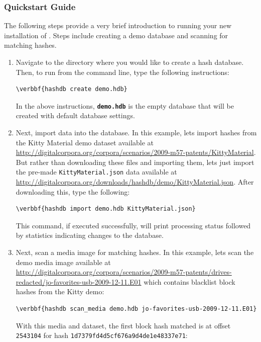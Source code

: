 \documentclass[11pt,fleqn]{article} %
\begin{document}
\subsubsection{Quickstart Guide}
The following steps provide a very brief introduction to running your new installation of \hdb. Steps include creating a demo database and scanning for matching hashes. 
\begin{enumerate}
\item Navigate to the directory where you would like to create a hash database. Then, to run \hdb from the command line, type the following instructions: 
\begin{Verbatim}[commandchars=\\\{\}]
\verbbf{hashdb create demo.hdb}
\end{Verbatim} 

In the above instructions, \texttt{\textbf{demo.hdb}} is the empty database that will be created with default database settings.

\item Next, import data into the database. In this example, lets import hashes from the Kitty Material demo dataset available at \url{http://digitalcorpora.org/corpora/scenarios/2009-m57-patents/KittyMaterial}. But rather than downloading these files and importing them, lets just import the pre-made \verb+KittyMaterial.json+ data available at \url{http://digitalcorpora.org/downloads/hashdb/demo/KittyMaterial.json}. After downloading this, type the following:
\begin{Verbatim}[commandchars=\\\{\}]
\verbbf{hashdb import demo.hdb KittyMaterial.json}
\end{Verbatim} 
This command, if executed successfully, will print processing status followed by statistics indicating changes to the database.

\item Next, scan a media image for matching hashes. In this example, lets scan the demo media image available at \url{http://digitalcorpora.org/corpora/scenarios/2009-m57-patents/drives-redacted/jo-favorites-usb-2009-12-11.E01} which contains blacklist block hashes from the Kitty demo:
\begin{Verbatim}[commandchars=\\\{\}]
\verbbf{hashdb scan_media demo.hdb jo-favorites-usb-2009-12-11.E01}
\end{Verbatim} 
With this media and dataset, the first block hash matched is at offset \verb+2543104+ for hash \verb+1d7379fd4d5cf676a9d4de1e48337e71+:


\end{enumerate}
\end{document}
